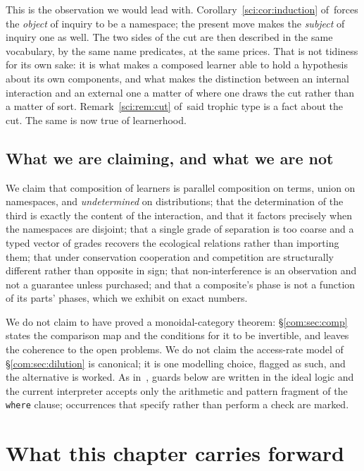 \begin{remark}\label{com:knower-known-become-one}
This is the observation we would lead with. Corollary~\ref{sci:cor:induction} of~\chSci forces the
\emph{object} of inquiry to be a namespace; the present move makes the \emph{subject} of inquiry
one as well. The two sides of the cut are then described in the same vocabulary, by the same name
predicates, at the same prices. That is not tidiness for its own sake: it is what makes a
composed learner able to hold a hypothesis about its own components, and what makes the
distinction between an internal interaction and an external one a matter of where one draws the
cut rather than a matter of sort. Remark~\ref{sci:rem:cut} of~\chSci said trophic type is a fact about
the cut. The same is now true of learnerhood.
\end{remark}

\subsection{What we are claiming, and what we are not}\label{com:S1.3}

We claim that composition of learners is parallel composition on terms, union on namespaces, and
\emph{undetermined} on distributions; that the determination of the third is exactly the content
of the interaction, and that it factors precisely when the namespaces are disjoint; that a single
grade of separation is too coarse and a typed vector of grades recovers the ecological relations
rather than importing them; that under conservation cooperation and competition are structurally
different rather than opposite in sign; that non-interference is an observation and not a
guarantee unless purchased; and that a composite's phase is not a function of its parts' phases,
which we exhibit on exact numbers.

We do not claim to have proved a monoidal-category theorem: \S\ref{com:sec:comp} states the
comparison map and the conditions for it to be invertible, and leaves the coherence to the
open problems. We do not claim the access-rate model of \S\ref{com:sec:dilution} is canonical; it is
one modelling choice, flagged as such, and the alternative is worked. As in~\chGame, guards
below are written in the ideal logic and the current interpreter accepts only the arithmetic and
pattern fragment of the \texttt{where} clause; occurrences that specify rather than perform a
check are marked.

\section{What this chapter carries forward}\label{com:S2}

